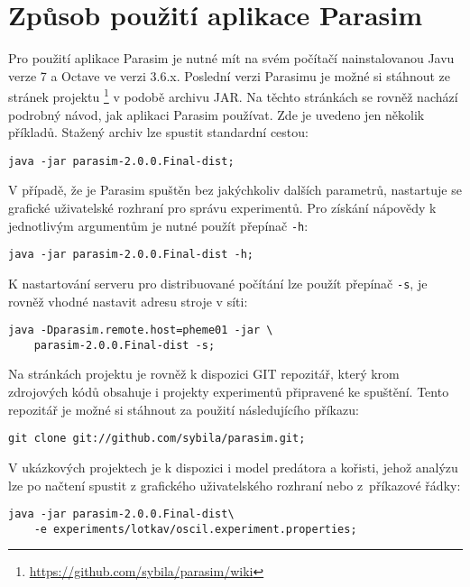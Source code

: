 \chapter{Způsob použití aplikace Parasim}\label{appendix:usage}

Pro použití aplikace Parasim je nutné mít na svém počítačí nainstalovanou Javu verze 7
a Octave ve verzi 3.6.x. Poslední verzi  Parasimu je možné si stáhnout ze
stránek projektu \footnote{\url{https://github.com/sybila/parasim/wiki}} v podobě
archivu JAR. Na těchto stránkách se rovněž nachází podrobný návod, jak aplikaci Parasim používat.
Zde je uvedeno jen několik příkladů. Stažený archiv lze spustit standardní cestou:

\begin{lstlisting}[style=Bash]
java -jar parasim-2.0.0.Final-dist;
\end{lstlisting}

V případě, že je Parasim spuštěn bez jakýchkoliv dalších parametrů, nastartuje se grafické
uživatelské rozhraní pro správu experimentů. Pro získání nápovědy k jednotlivým argumentům
je nutné použít přepínač \texttt{-h}:

\begin{lstlisting}[style=Bash]
java -jar parasim-2.0.0.Final-dist -h;
\end{lstlisting}

K nastartování serveru pro distribuované počítání lze použít přepínač \texttt{-s},
je rovněž vhodné nastavit adresu stroje v síti:

\begin{lstlisting}[style=Bash]
java -Dparasim.remote.host=pheme01 -jar \
	parasim-2.0.0.Final-dist -s;
\end{lstlisting}

Na stránkách projektu je rovněž k dispozici GIT repozitář, který krom zdrojových kódů obsahuje
i projekty experimentů připravené ke spuštění. Tento repozitář je možné si stáhnout
za použití následujícího příkazu:

\begin{lstlisting}[style=Bash]
git clone git://github.com/sybila/parasim.git;
\end{lstlisting}

V ukázkových projektech je k dispozici i model predátora a kořisti, jehož analýzu
lze po načtení spustit z grafického uživatelského rozhraní nebo z~příkazové řádky:

\begin{lstlisting}[style=Bash]
java -jar parasim-2.0.0.Final-dist\
	-e experiments/lotkav/oscil.experiment.properties;
\end{lstlisting}
